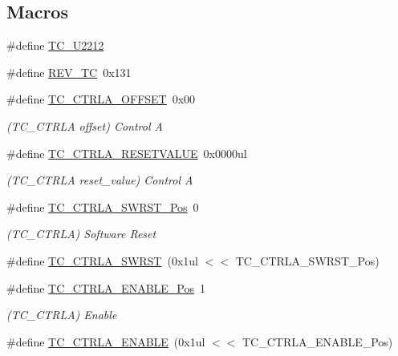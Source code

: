 \subsection*{Macros}
\begin{DoxyCompactItemize}
\item 
\#define \mbox{\hyperlink{group___s_a_m_d21___t_c_ga3fbfb14bacf3f0cace56dd3a65d7e591}{T\+C\+\_\+\+U2212}}
\item 
\#define \mbox{\hyperlink{group___s_a_m_d21___t_c_gabcc45dcc7fd74357245ffdc3e5c65cda}{R\+E\+V\+\_\+\+TC}}~0x131
\item 
\#define \mbox{\hyperlink{group___s_a_m_d21___t_c_ga9eb7017b395a54f7ca9b9da83cc191e7}{T\+C\+\_\+\+C\+T\+R\+L\+A\+\_\+\+O\+F\+F\+S\+ET}}~0x00
\begin{DoxyCompactList}\small\item\em (T\+C\+\_\+\+C\+T\+R\+LA offset) Control A \end{DoxyCompactList}\item 
\#define \mbox{\hyperlink{group___s_a_m_d21___t_c_gaadad5111a08d20825cd5413ab481a673}{T\+C\+\_\+\+C\+T\+R\+L\+A\+\_\+\+R\+E\+S\+E\+T\+V\+A\+L\+UE}}~0x0000ul
\begin{DoxyCompactList}\small\item\em (T\+C\+\_\+\+C\+T\+R\+LA reset\+\_\+value) Control A \end{DoxyCompactList}\item 
\#define \mbox{\hyperlink{group___s_a_m_d21___t_c_ga0724c3271e5836ea2a22432dd4fb010d}{T\+C\+\_\+\+C\+T\+R\+L\+A\+\_\+\+S\+W\+R\+S\+T\+\_\+\+Pos}}~0
\begin{DoxyCompactList}\small\item\em (T\+C\+\_\+\+C\+T\+R\+LA) Software Reset \end{DoxyCompactList}\item 
\#define \mbox{\hyperlink{group___s_a_m_d21___t_c_ga9e0b3aaacef1a3036378af914f41b740}{T\+C\+\_\+\+C\+T\+R\+L\+A\+\_\+\+S\+W\+R\+ST}}~(0x1ul $<$$<$ T\+C\+\_\+\+C\+T\+R\+L\+A\+\_\+\+S\+W\+R\+S\+T\+\_\+\+Pos)
\item 
\#define \mbox{\hyperlink{group___s_a_m_d21___t_c_ga1f1f50da3e9afaa40a155ad5410adc65}{T\+C\+\_\+\+C\+T\+R\+L\+A\+\_\+\+E\+N\+A\+B\+L\+E\+\_\+\+Pos}}~1
\begin{DoxyCompactList}\small\item\em (T\+C\+\_\+\+C\+T\+R\+LA) Enable \end{DoxyCompactList}\item 
\#define \mbox{\hyperlink{group___s_a_m_d21___t_c_ga4c7d988416a5d9104340256cb66d3200}{T\+C\+\_\+\+C\+T\+R\+L\+A\+\_\+\+E\+N\+A\+B\+LE}}~(0x1ul $<$$<$ T\+C\+\_\+\+C\+T\+R\+L\+A\+\_\+\+E\+N\+A\+B\+L\+E\+\_\+\+Pos)

\end{DoxyCompactItemize}

